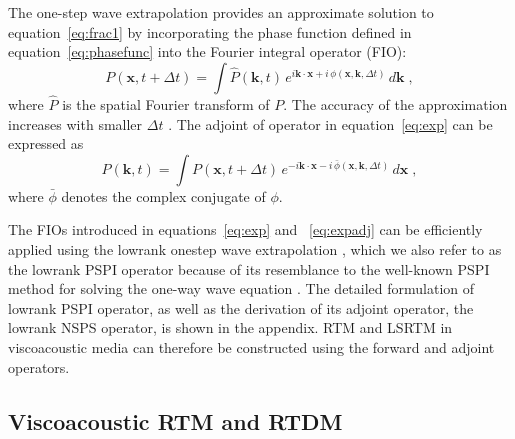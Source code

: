 The one-step wave extrapolation provides an approximate solution to equation~\ref{eq:frac1} by incorporating the phase function defined in equation~\ref{eq:phasefunc} into the Fourier integral operator (FIO):
\begin{equation}
  \label{eq:exp}
  P(\mathbf{x},t+\Delta t) = \int \hat{P}(\mathbf{k},t)\,e^{i\mathbf{k} \cdot \mathbf{x} + i\,\phi(\mathbf{x},\mathbf{k},\Delta t)}\,d\mathbf{k}\;,
\end{equation}
where $\hat{P}$ is the spatial Fourier transform of $P$. The accuracy of the approximation increases with smaller $\Delta t$ \cite[]{lowrank}. The adjoint of operator in equation~\ref{eq:exp} can be expressed as
\begin{equation}
  \label{eq:expadj}
  \hat{P}(\mathbf{k},t) = \int P(\mathbf{x},t+\Delta t)\,e^{-i\mathbf{k} \cdot \mathbf{x} - i\,\bar{\phi}(\mathbf{x},\mathbf{k},\Delta t)}\,d\mathbf{x}\; ,
\end{equation}
where $\bar{\phi}$ denotes the complex conjugate of $\phi$.

The FIOs introduced in equations~\ref{eq:exp} and ~\ref{eq:expadj} can be efficiently applied using the lowrank onestep wave extrapolation \cite{me15a}, which we also refer to as the lowrank PSPI operator because of its resemblance to the well-known PSPI method for solving the one-way wave equation \cite[]{gazdag84,kessinger,margraveandferguson}. The detailed formulation of lowrank PSPI operator, as well as the derivation of its adjoint operator, the lowrank NSPS operator, is shown in the appendix. RTM and LSRTM in viscoacoustic media can therefore be constructed using the forward and adjoint operators. 

\subsection{Viscoacoustic RTM and RTDM}


